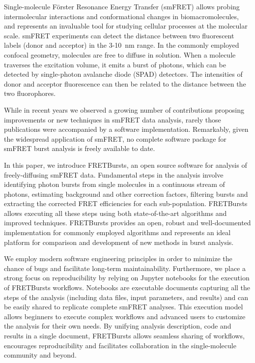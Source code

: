 Single-molecule Förster Resonance Energy Transfer (smFRET) allows
probing intermolecular interactions and conformational changes in
biomacromolecules, and represents an invaluable tool for studying
cellular processes at the molecular scale. smFRET experiments can
detect the distance between two fluorescent labels (donor and acceptor)
in the 3-10~nm range. In the commonly employed confocal geometry,
molecules are free to diffuse in solution. When a molecule traverses
the excitation volume, it emits a burst of photons, which can be detected
by single-photon avalanche diode (SPAD) detectors. The intensities of
donor and acceptor fluorescence can then be related to the distance
between the two fluorophores.

While in recent years we observed a growing number of contributions
proposing improvements or new techniques in smFRET data analysis,
rarely those publications were accompanied by a software implementation.
Remarkably, given the widespread application of smFRET, no complete
software package for smFRET burst analysis is freely available to date.

In this paper, we introduce FRETBursts, an open source software
for analysis of freely-diffusing smFRET data.
Fundamental steps in the analysis involve identifying photon bursts
from single molecules in a continuous stream of photons, estimating
background and other correction factors, filtering bursts and extracting
the corrected FRET efficiencies for each sub-population.
FRETBursts allows executing all these steps using both state-of-the-art
algorithms and improved techniques.
FRETBursts provides an open, robust and well-documented
implementation for commonly employed algorithms and represents
an ideal platform for comparison and development of new methods
in burst analysis.

We employ modern software engineering principles in order to
minimize the chance of bugs and facilitate long-term maintainability.
Furthermore, we place a strong focus on reproducibility by relying on
Jupyter notebooks for the execution of FRETBursts workflows.
Notebooks are executable documents capturing all the steps of the
analysis (including data files, input parameters, and results) and can
be easily shared to replicate complete smFRET analyses.
This execution model allows beginners to execute complex workflows
and advanced users to customize the analysis for their own needs.
By unifying analysis description, code and results in a single document, 
FRETBursts allows seamless sharing of workflows, encourages
reproducibility and facilitates collaboration in the 
single-molecule community and beyond.
